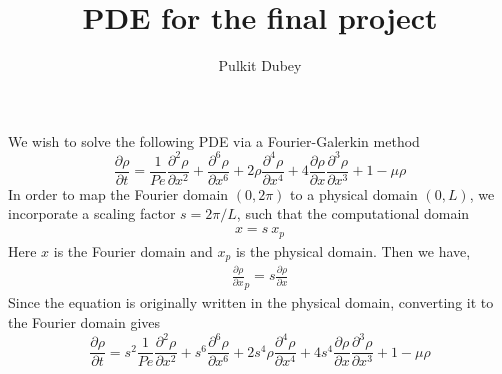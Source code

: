 \documentclass{article}[12]
\title{PDE for the final project}
\author{Pulkit Dubey}
\newcommand{\pd}[2]{\frac{\partial{#1}}{\partial{#2}}}
\newcommand{\pdd}[2]{\frac{\partial^2{#1}}{\partial{#2}^2}}
\begin{document}
\maketitle

We wish to solve the following PDE via a Fourier-Galerkin method
\begin{equation}
    \pd \rho t =
    \frac{1}{Pe} \pdd \rho x + 
    \frac{\partial^6 \rho}{\partial x^6} +
    2 \rho \frac{\partial^4 \rho}{\partial x^4} +
    4 \frac{\partial \rho}{\partial x} \frac{\partial^3 \rho}{\partial x^3} +
    1 - \mu \rho 
\end{equation}
In order to map the Fourier domain $(0, 2\pi)$ to a physical domain $(0, L)$, we
incorporate a scaling factor $s = 2\pi/L$, such that the computational domain
\begin{align}
    x = s \: x_p
\end{align}
Here $x$ is the Fourier domain and $x_p$ is the physical domain. Then we have,
\begin{align}
    \pd \rho x_p = s  \pd \rho x
\end{align}
Since the equation is originally written in the physical domain, converting it
to the Fourier domain gives
\begin{equation}
    \pd \rho t =
    s^2 \frac{1}{Pe} \pdd \rho x + 
    s^6 \frac{\partial^6 \rho}{\partial x^6} +
    2 s^4 \rho \frac{\partial^4 \rho}{\partial x^4} +
    4 s^4 \frac{\partial \rho}{\partial x} \frac{\partial^3 \rho}{\partial x^3} +
    1 - \mu \rho 
\end{equation}
\end{document}
